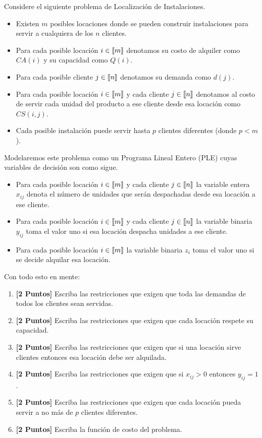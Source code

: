 \documentclass[ a4paper, twoside, 11pt]{article}
\begin{document}
\begin{problem}
Considere el siguiente problema de Localizaci\'on de Instalaciones. 
\begin{itemize}
\item Existen $m$ posibles locaciones donde se pueden construir instalaciones para servir a cualquiera de los $n$ clientes. 
\item Para cada posible locaci\'on $i \in \llbracket m \rrbracket$ denotamos su costo de alquiler como $CA(i)$ y su capacidad como $Q(i)$. 
\item Para cada posible cliente $j \in \llbracket n \rrbracket$ denotamos su demanda como $d(j)$. 
\item Para cada posible locaci\'on $i \in \llbracket m \rrbracket$ y cada cliente $j \in \llbracket n \rrbracket$ denotamos al costo de servir cada unidad del producto a ese cliente desde esa locaci\'on como $CS(i,j)$. 
\item Cada posible instalaci\'on puede servir hasta $p$ clientes diferentes (donde $p < m$). 
\end{itemize}

Modelaremos este problema como un Programa Lineal Entero (PLE) cuyas variables de decisi\'on son como sigue. 
\begin{itemize}
\item Para cada posible locaci\'on $i \in \llbracket m \rrbracket$ y cada cliente $j \in \llbracket n \rrbracket$ la variable entera $x_{ij}$ denota el n\'umero de unidades que ser\'an despachadas desde esa locaci\'on a ese cliente. 
\item Para cada posible locaci\'on $i \in \llbracket m \rrbracket$ y cada cliente $j \in \llbracket n \rrbracket$ la variable binaria $y_{ij}$ toma el valor uno si esa locaci\'on despacha unidades a ese cliente. 
\item Para cada posible locaci\'on $i \in \llbracket m \rrbracket$ la variable binaria $z_i$ toma el valor uno si se decide alquilar esa locaci\'on. 
\end{itemize}

Con todo esto en mente: 
\begin{enumerate}[label=\textbf{\alph*)}]
\item \textbf{[2 Puntos]} Escriba las restricciones que exigen que toda las demandas de todos los clientes sean servidas. 
\item \textbf{[2 Puntos]} Escriba las restricciones que exigen que cada locaci\'on respete su capacidad. 
\item \textbf{[2 Puntos]} Escriba las restricciones que exigen que si una locaci\'on sirve clientes entonces esa locaci\'on debe ser alquilada. 
\item \textbf{[2 Puntos]} Escriba las restricciones que exigen que si $x_{ij} > 0$ entonces $y_{ij} = 1$. 
\item \textbf{[2 Puntos]} Escriba las restricciones que exigen que cada locaci\'on pueda servir a no m\'as de $p$ clientes diferentes. 
\item \textbf{[2 Puntos]} Escriba la funci\'on de costo del problema. 
\end{enumerate}
\QED

\end{problem}
\fullskip
\end{document}
